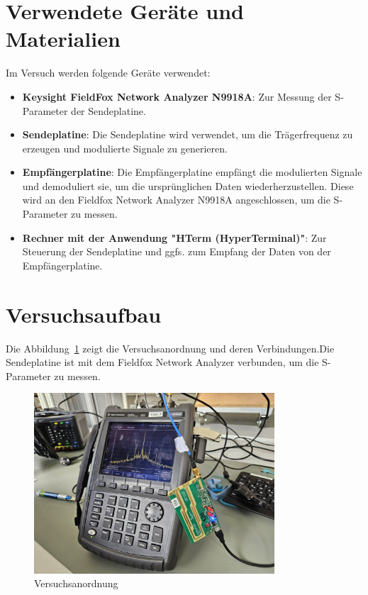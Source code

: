 \section{Verwendete Geräte und Materialien}
Im Versuch werden folgende Geräte verwendet:
\begin{itemize}
    \item \textbf{Keysight FieldFox Network Analyzer N9918A}: Zur Messung der S-Parameter der Sendeplatine.
    \item \textbf{Sendeplatine}: Die Sendeplatine wird verwendet, um die Trägerfrequenz zu erzeugen und modulierte Signale zu generieren.
    \item \textbf{Empfängerplatine}: Die Empfängerplatine empfängt die modulierten Signale und demoduliert sie, um die ursprünglichen Daten wiederherzustellen. Diese wird an den Fieldfox Network Analyzer N9918A angeschlossen, um die S-Parameter zu messen.
    \item \textbf{Rechner mit der Anwendung "HTerm (HyperTerminal)"}: Zur Steuerung der Sendeplatine und ggfs. zum Empfang der Daten von der Empfängerplatine. 
\end{itemize}
\clearpage
\section{Versuchsaufbau}
Die Abbildung~\ref{fig:Versuchsanordnung} zeigt die Versuchsanordnung und deren Verbindungen.Die Sendeplatine ist mit dem Fieldfox Network Analyzer verbunden, um die S-Parameter zu messen.
\begin{figure}[H]
    \centering
    \includegraphics[width=0.8\textwidth]{Pictures/Versuchsanordnung.jpg}
    \caption{Versuchsanordnung}
    \label{fig:Versuchsanordnung}
\end{figure}
\clearpage